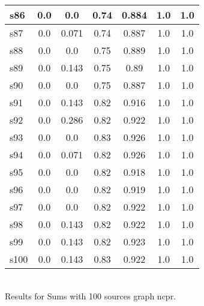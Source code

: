 \documentclass{article}
\begin{document}
\begin{tabular}{|l|c|c|c|c|c|c|}
\hline
s86 &0.0 & 0.0 & 0.74 & 0.884 & 1.0 & 1.0\\
\hline
s87 &0.0 & 0.071 & 0.74 & 0.887 & 1.0 & 1.0\\
\hline
s88 &0.0 & 0.0 & 0.75 & 0.889 & 1.0 & 1.0\\
\hline
s89 &0.0 & 0.143 & 0.75 & 0.89 & 1.0 & 1.0\\
\hline
s90 &0.0 & 0.0 & 0.75 & 0.887 & 1.0 & 1.0\\
\hline
s91 &0.0 & 0.143 & 0.82 & 0.916 & 1.0 & 1.0\\
\hline
s92 &0.0 & 0.286 & 0.82 & 0.922 & 1.0 & 1.0\\
\hline
s93 &0.0 & 0.0 & 0.83 & 0.926 & 1.0 & 1.0\\
\hline
s94 &0.0 & 0.071 & 0.82 & 0.926 & 1.0 & 1.0\\
\hline
s95 &0.0 & 0.0 & 0.82 & 0.918 & 1.0 & 1.0\\
\hline
s96 &0.0 & 0.0 & 0.82 & 0.919 & 1.0 & 1.0\\
\hline
s97 &0.0 & 0.0 & 0.82 & 0.922 & 1.0 & 1.0\\
\hline
s98 &0.0 & 0.143 & 0.82 & 0.922 & 1.0 & 1.0\\
\hline
s99 &0.0 & 0.143 & 0.82 & 0.923 & 1.0 & 1.0\\
\hline
s100 &0.0 & 0.143 & 0.83 & 0.922 & 1.0 & 1.0\\
\hline
\end{tabular}\\

\noindent Results for Sums with 100 sources graph ncpr.
\end{document}
